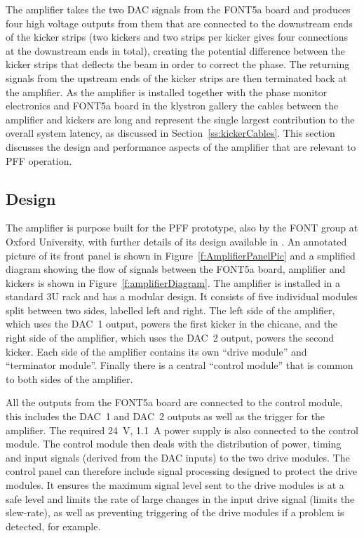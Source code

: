 
The amplifier takes the two DAC signals from the FONT5a board and produces four high voltage outputs from them that are connected to the downstream ends of the kicker strips (two kickers and two strips per kicker gives four connections at the downstream ends in total), creating the potential difference between the kicker strips that deflects the beam in order to correct the phase. The returning signals from the upstream ends of the kicker strips are then terminated back at the amplifier. As the amplifier is installed together with the phase monitor electronics and FONT5a board in the klystron gallery the cables between the amplifier and kickers are long and represent the single largest contribution to the overall system latency, as discussed in Section~\ref{ss:kickerCables}. This section discusses the design and performance aspects of the amplifier that are relevant to PFF operation.

\subsection{Design}
\label{ss:ampDesign}

The amplifier is purpose built for the PFF prototype, also by the FONT group at Oxford University, with further details of its design available in \cite{colinCLIC16}. An annotated picture of its front panel is shown in Figure~\ref{f:AmplifierPanelPic} and a smplified diagram showing the flow of signals between the FONT5a board, amplifier and kickers is shown in Figure~\ref{f:amplifierDiagram}.
The amplifier is installed in a standard 3U rack and has a modular design. It consists of five individual modules split between two sides, labelled left and right. The left side of the amplifier, which uses the DAC~1 output, powers the first kicker in the chicane, and the right side of the amplifier, which uses the DAC~2 output, powers the second kicker. Each side of the amplifier contains its own ``drive module'' and ``terminator module''. Finally there is a central ``control module'' that is common to both sides of the amplifier.

All the outputs from the FONT5a board are connected to the control module, this includes the DAC~1 and DAC~2 outputs as well as the trigger for the amplifier. The required 24~V, 1.1~A power supply is also connected to the control module. The control module then deals with the distribution of power, timing and input signals (derived from the DAC inputs) to the two drive modules. The control panel can therefore include signal processing designed to protect the drive modules. It ensures the maximum signal level sent to the drive modules is at a safe level and limits the rate of large changes in the input drive signal (limits the slew-rate), as well as preventing triggering of the drive modules if a problem is detected, for example.

